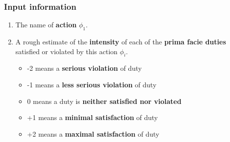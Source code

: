 \documentclass[11pt]{article}
\begin{document}
\subsubsection{Input information}
\label{sec:orgb511288}
\begin{enumerate}
\item The name of \textbf{action} \(\phi_1\).
\item A rough estimate of the \textbf{intensity} of each of the \textbf{prima facie duties} satisfied or violated by this action \(\phi_i\).
\begin{itemize}
\item -2 means a \textbf{serious violation} of duty
\item -1 means a \textbf{less serious violation} of duty
\item 0 means a duty is \textbf{neither satisfied nor violated}
\item +1 means a \textbf{minimal satisfaction} of duty
\item +2 means a \textbf{maximal satisfaction} of duty
\end{itemize}
\end{enumerate}

 \newpage
\end{document}

